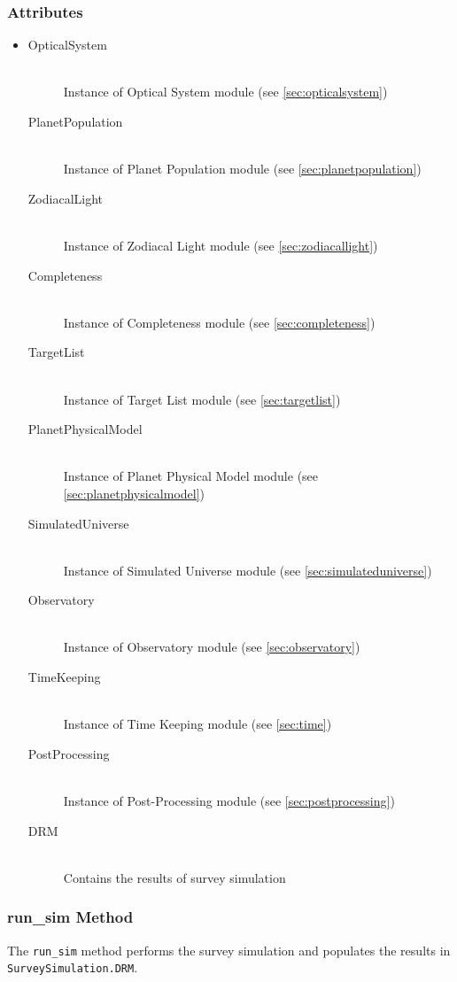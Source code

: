 \documentclass[cleanfoot]{asme2ej}
\begin{document}
\subsubsection*{Attributes}
\begin{itemize}
    \item
    \begin{description}
        \item[OpticalSystem] \hfill \\
        Instance of Optical System module (see \ref{sec:opticalsystem})
        \item[PlanetPopulation] \hfill \\
        Instance of Planet Population module (see \ref{sec:planetpopulation})
        \item[ZodiacalLight] \hfill \\
        Instance of Zodiacal Light module (see \ref{sec:zodiacallight})
        \item[Completeness] \hfill \\
        Instance of Completeness module (see \ref{sec:completeness})
        \item[TargetList] \hfill \\
        Instance of Target List module (see \ref{sec:targetlist})
        \item[PlanetPhysicalModel] \hfill \\
        Instance of Planet Physical Model module (see \ref{sec:planetphysicalmodel})
        \item[SimulatedUniverse] \hfill \\
        Instance of Simulated Universe module (see \ref{sec:simulateduniverse})
        \item[Observatory] \hfill \\
        Instance of Observatory module (see \ref{sec:observatory})
        \item[TimeKeeping] \hfill \\
        Instance of Time Keeping module (see \ref{sec:time})
        \item[PostProcessing] \hfill \\
        Instance of Post-Processing module (see \ref{sec:postprocessing})
        \item[DRM] \hfill \\
        Contains the results of survey simulation
    \end{description}
\end{itemize}

\subsubsection{run\_sim Method} \label{sec:runsimtask}
The \verb+run_sim+ method performs the survey simulation and populates the results in \verb+SurveySimulation.DRM+.
\end{document}
